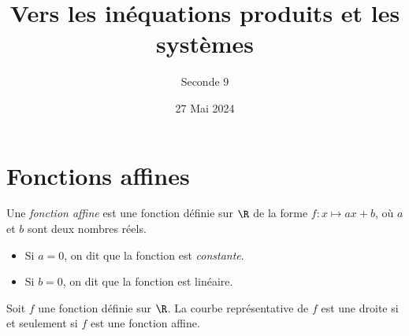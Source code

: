 \documentclass{exam}
\author{Seconde 9}
\title{Vers les inéquations produits et les systèmes}
\date{27 Mai 2024}
\begin{document}
\maketitle

\section{Fonctions affines}
\begin{definitionbox}
Une \emph{fonction affine} est une fonction définie sur $\R$ de la forme $f \colon x \mapsto ax + b$, où $a$ et $b$ sont deux nombres réels. 
\begin{itemize}
\item Si $a = 0$, on dit que la fonction est \emph{constante}. 
\item Si $b = 0$, on dit que la fonction est linéaire.
\end{itemize}
\end{definitionbox}
\begin{proposition}
Soit $f$ une fonction définie sur $\R$. La courbe représentative de $f$ est une droite si et seulement si $f$ est une fonction affine.
\end{proposition}
\end{document}
